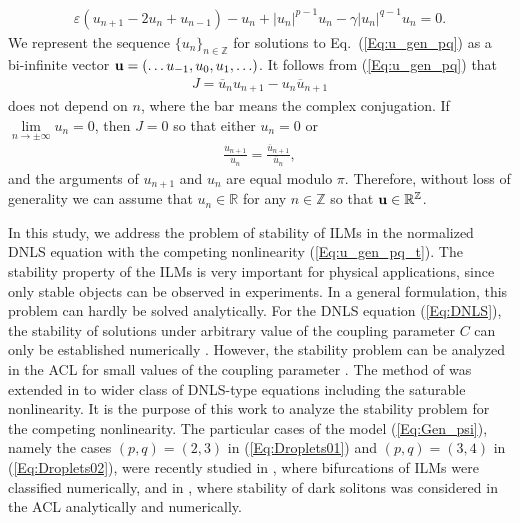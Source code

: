 \documentclass[12pt,reqno]{amsart}
\begin{document}
\begin{gather}
    \varepsilon\left(u_{n+1}-2u_n+u_{n-1}\right)- u_n+\left|u_n\right|^{p-1} u_n-\gamma\left|u_n\right|^{q-1} u_n=0. 
    \label{Eq:u_gen_pq}
\end{gather}
We represent the sequence $\{ u_n \}_{n \in \mathbb{Z}}$ for solutions to  Eq.~(\ref{Eq:u_gen_pq}) as a bi-infinite vector ${\bf u}=(\ldots u_{-1},u_0,u_1,\ldots)$. It follows from (\ref{Eq:u_gen_pq}) that 
\begin{gather*}
J=\overline{u}_nu_{n+1}-u_n\overline{u}_{n+1}
\end{gather*}
does not depend on $n$, where the bar means the complex conjugation. 
If $\lim\limits_{n \to \pm \infty} u_n = 0$, then $J=0$ so that either $u_n=0$ or
\begin{gather*}
\frac{u_{n+1}}{u_{n}}=\frac{\overline{u}_{n+1}}{\overline{u}_{n}},
\end{gather*}
and the arguments of $u_{n+1}$ and $u_n$ are equal modulo $\pi$.  Therefore, without loss of generality  we can assume that $u_n \in\mathbb{R}$ for any $n\in\mathbb{Z}$ so that ${\bf u} \in \mathbb{R}^{\mathbb{Z}}$.

In this study, we address the problem of stability of ILMs in the normalized DNLS equation with the competing nonlinearity (\ref{Eq:u_gen_pq_t}). The stability property of the ILMs is very important for physical applications, since only stable objects can be observed in experiments.  In a general formulation, this problem can hardly be solved analytically. For the  DNLS equation (\ref{Eq:DNLS}), the stability of solutions under arbitrary value of the coupling parameter $C$ can only be established numerically \cite{K2009}. However, the stability problem can be analyzed in the ACL for small values of the coupling parameter \cite{PKF05}. The method of  \cite{PKF05} was extended in \cite{RNKF09} to wider class of DNLS-type equations including the saturable nonlinearity. It is the purpose of this work to analyze the stability problem for the competing nonlinearity. The particular cases of the model (\ref{Eq:Gen_psi}), namely the cases $(p,q) = (2,3)$ in (\ref{Eq:Droplets01}) 
and $(p,q) = (3,4)$ in (\ref{Eq:Droplets02}), were recently studied in \cite{AKA25}, where bifurcations of ILMs were classified numerically, 
and in \cite{SuzantoStudies}, where stability of dark solitons was considered 
in the ACL analytically and numerically. 
\end{document}
